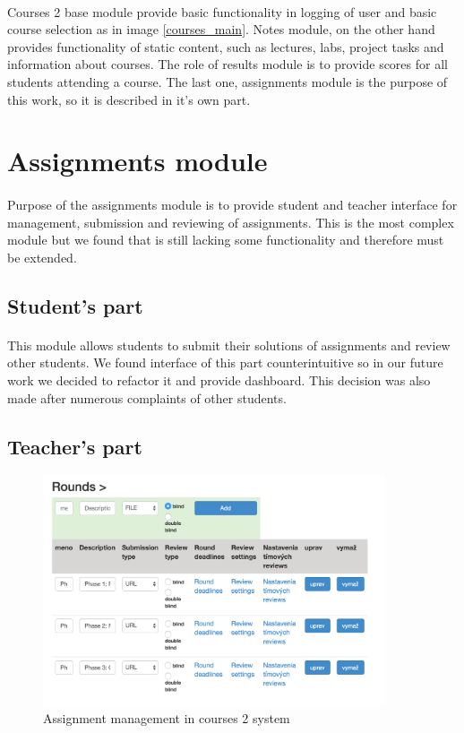 \paragraph{}
Courses 2 base module provide basic functionality in logging of user and basic course selection as in image \ref{courses_main}. Notes module, on the other hand provides functionality of static content, such as lectures, labs, project tasks and information about courses. The role of results module is to provide scores for all students attending a course. The last one, assignments module is the purpose of this work, so it is described in it's own part.

\section{Assignments module}
\paragraph{}
Purpose of the assignments module is to provide student and teacher interface for management, submission and reviewing of assignments. This is the most complex module but we found that is still lacking some functionality and therefore must be extended.

\subsection{Student's part}
\paragraph{}
This module allows students to submit their solutions of assignments and review other students. We found interface of this part counterintuitive so in our future work we decided to refactor it and provide dashboard. This decision was also made after numerous complaints of other students.

\subsection{Teacher's part}


\begin{figure}[t]
    \centering
    \includegraphics[width=0.9\textwidth]{courses/rounds.png}
    \caption{Assignment management in courses 2 system}
    \label{courses_assignment_admin}
\end{figure}


